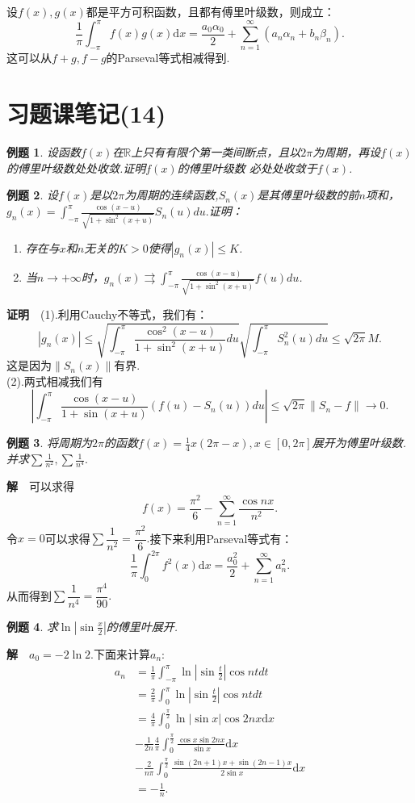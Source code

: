 \documentclass[UTF8]{article}
\newcommand{\R}{\mathbb{R}}
\newcommand{\dx}{\mathrm{d}x}
\newcommand{\zm}{\textbf{证明}$\quad$}
\newcommand{\jie}{\textbf{解}$\quad$}
\newtheorem{exa}{\hspace{2em}例题}[section]
\begin{document}
  设$f(x),g(x)$都是平方可积函数，且都有傅里叶级数，则成立：
  $$\frac{1}{\pi}\int_{-\pi}^\pi f(x)g(x)\dx=
  \frac{a_0\alpha_0}{2}+\sum_{n=1}^\infty(a_n\alpha_n+b_n\beta_n).$$
  这可以从$f+g,f-g$的Parseval等式相减得到.
  \clearpage
  \section{习题课笔记(14)}
  \begin{exa}
    设函数$f(x)$在$\R$上只有有限个第一类间断点，且以$2\pi$为周期，再设$f(x)$的傅里叶级数处处收敛.证明$f(x)$的傅里叶级数
    必处处收敛于$f(x)$.
  \end{exa}
  \begin{exa}
    设$f(x)$是以$2\pi$为周期的连续函数,$S_n(x)$是其傅里叶级数的前$n$项和，
    $g_n(x)=\int_{-\pi}^\pi\frac{\cos(x-u)}{\sqrt{1+\sin^2(x+u)}}S_n(u)du.$证明：
    \begin{enumerate}
      \item 存在与$x$和$n$无关的$K>0$使得$|g_n(x)|\le K$.
      \item 当$n\to+\infty$时，$g_n(x)\rightrightarrows \int_{-\pi}^\pi
      \frac{\cos(x-u)}{\sqrt{1+\sin^2(x+u)}}f(u)du$.
    \end{enumerate}
  \end{exa}
  \zm (1).利用Cauchy不等式，我们有：
  $$|g_n(x)|\le\sqrt{\int_{-\pi}^\pi\frac{\cos^2(x-u)}{1+\sin^2(x+u)}du}\sqrt{\int_{-\pi}^\pi S_n^2(u)du}\le\sqrt{2\pi}M.$$
  这是因为$\|S_n(x)\|$有界.\\
  (2).两式相减我们有
  $$\left|\int_{-\pi}^\pi\frac{\cos(x-u)}{1+\sin(x+u)}(f(u)-S_n(u))du\right|\le
  \sqrt{2\pi}\|S_n-f\|\to 0.$$
  \begin{exa}
    将周期为$2\pi$的函数$f(x)=\frac{1}{4}x(2\pi-x),x\in[0,2\pi]$展开为傅里叶级数.并求$\sum\frac{1}{n^2},
    \sum\frac{1}{n^4}.$
  \end{exa}
  \jie 可以求得
  $$f(x)=\frac{\pi^2}{6}-\sum_{n=1}^\infty\frac{\cos nx}{n^2}.$$
  令$x=0$可以求得$\sum\dfrac{1}{n^2}=\dfrac{\pi^2}{6}.$接下来利用Parseval等式有：
  $$\frac{1}{\pi}\int_0^{2\pi}f^2(x)\dx=\frac{a_0^2}{2}+\sum_{n=1}^\infty a_n^2.$$
  从而得到$\sum\dfrac{1}{n^4}=\dfrac{\pi^4}{90}.$
  \begin{exa}
    求$\ln|\sin\frac{x}{2}|$的傅里叶展开.
  \end{exa}
  \jie $a_0=-2\ln2.$下面来计算$a_n$:
  \begin{align*}
    a_n&=\frac{1}{\pi}\int_{-\pi}^\pi\ln|\sin\frac{t}{2}|\cos ntdt\\
    &=\frac{2}{\pi}\int_0^\pi\ln|\sin\frac{t}{2}|\cos ntdt\\
    &=\frac{4}{\pi}\int_0^\frac{\pi}{2}\ln|\sin x|\cos 2nx\dx\\
    &-\frac{1}{2n}\frac{4}{\pi}\int_0^\frac{\pi}{2}\frac{\cos x\sin 2nx}{\sin x}\dx\\
    &-\frac{2}{n\pi}\int_0^\frac{\pi}{2}\frac{\sin(2n+1)x+\sin(2n-1)x}{2\sin x}\dx\\
    &=-\frac{1}{n}.
  \end{align*}
\end{document}
